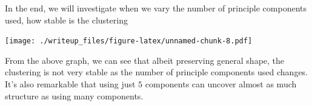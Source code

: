 \documentclass[]{article}
\newenvironment{Shaded}{\begin{snugshade}}{\end{snugshade}}
\newcommand{\KeywordTok}[1]{\textcolor[rgb]{0.13,0.29,0.53}{\textbf{{#1}}}}
\newcommand{\DataTypeTok}[1]{\textcolor[rgb]{0.13,0.29,0.53}{{#1}}}
\newcommand{\DecValTok}[1]{\textcolor[rgb]{0.00,0.00,0.81}{{#1}}}
\newcommand{\StringTok}[1]{\textcolor[rgb]{0.31,0.60,0.02}{{#1}}}
\newcommand{\CommentTok}[1]{\textcolor[rgb]{0.56,0.35,0.01}{\textit{{#1}}}}
\newcommand{\NormalTok}[1]{{#1}}
\begin{document}
In the end, we will investigate when we vary the number of principle
components used, how stable is the clustering

\begin{Shaded}
\end{Shaded}

\texttt{[image: ./writeup\_files/figure-latex/unnamed-chunk-8.pdf]}

From the above graph, we can see that albeit preserving general shape,
the clustering is not very stable as the number of principle components
used changes. It's also remarkable that using just $5$ components can
uncover almost as much structure as using many components.
\end{document}
